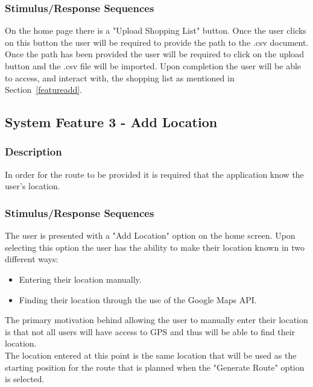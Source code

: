 \documentclass[10pt, a4paper, onecolumn]{scrartcl}
\begin{document}
			\subsubsection{Stimulus/Response Sequences}
			
				On the home page there is a "Upload Shopping List" button. Once the user clicks on this button the user will be required to provide the path to the .csv document. Once the path has been provided the user will be required to click on the upload button and the .csv file will be imported. Upon completion the user will be able to access, and interact with, the shopping list as mentioned in Section~\ref{featureadd}.
		
		\subsection{System Feature 3 - Add Location}
				
			\subsubsection{Description}
			
				In order for the route to be provided it is required that the application know the user's location. 
				
			\subsubsection{Stimulus/Response Sequences}
			
				The user is presented with a "Add Location" option on the home screen. Upon selecting this option the user has the ability to make their location known in two different ways:
				
				\begin{itemize}
					\item Entering their location manually.
					\item Finding their location through the use of the Google Maps API.
				\end{itemize}
				
				The primary motivation behind allowing the user to manually enter their location is that not all users will have access to GPS and thus will be able to find their location.\\
				
				The location entered at this point is the same location that will be used as the starting position for the route that is planned when the "Generate Route" option is selected.
				
\end{document}
